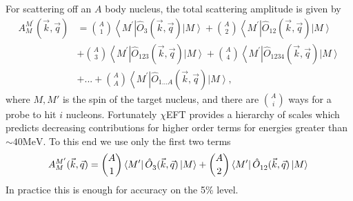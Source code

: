 \documentclass[a4paper,11pt]{article}
\newcommand\bv[1]{\vec{#1}}
\newcommand{\MeV}{\mathrm{MeV}}
\begin{document}
For scattering off an $A$ body nucleus, the total scattering
amplitude is given by
\begin{align}
  A_{M}^{M^{\prime} }(\bv{k}, \bv{q})&=\binom{A}{1}\left\langle
  M^{\prime}\right|\hat{O}_{3}^{}(\bv{k}, \bv{q})\left|M\right
  \rangle + \binom{A}{2} \left\langle
  M^{\prime}\right|\hat{O}_{12}^{}(\bv{k}, \bv{q}) \left|
  M\right\rangle\nonumber\\
  &+ \binom{A}{3}\left\langle
  M^{\prime}\right|\hat{O}_{123}^{}(\bv{k}, \bv{q})\left|M\right
  \rangle + \binom{A}{4} \left\langle
  M^{\prime}\right|\hat{O}_{1234}^{}(\bv{k}, \bv{q}) \left| M\right\rangle\\
  &+... + \binom{A}{A}\left\langle
  M^{\prime}\right|\hat{O}_{1...A}^{}(\bv{k}, \bv{q})\left|M\right
  \rangle,\nonumber
\end{align}
where $M,M'$ is the spin of the target nucleus, and there are
$\binom{A}{i}$ ways for a probe to hit $i$ nucleons. Fortunately
$\chi$EFT provides a hierarchy of scales which predicts decreasing
contributions for higher order terms for energies greater than $\sim 40 \MeV$.
To this end we use only the first two terms
\begin{equation}
  A_{M}^{M^{\prime} }(\bv{k}, \bv{q})=\binom{A}{1}\left\langle
  M^{\prime}\right|\hat{O}_{3}^{}(\bv{k}, \bv{q})\left|M\right
  \rangle + \binom{A}{2} \left\langle
  M^{\prime}\right|\hat{O}_{12}^{}(\bv{k}, \bv{q}) \left|
  M\right\rangle\nonumber\\
\end{equation}
In practice this is enough for accuracy on the 5\% level.
\end{document}
